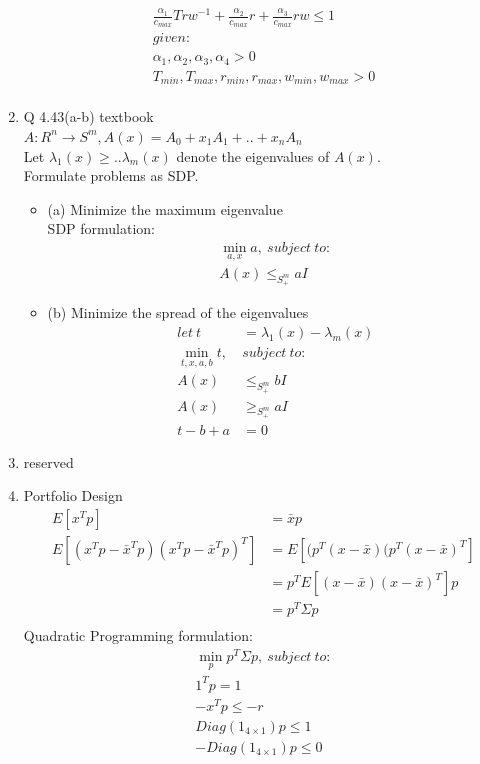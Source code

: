 \documentclass[12pt,letter]{article}
\begin{document}
\begin{enumerate}
\begin{align*}
    \frac{\alpha_1}{c_{max}} T rw^{-1} + \frac{\alpha_2}{c_{max}} r + \frac{\alpha_3}{c_{max}} r w \leq 1\\
    given:\\
    \alpha_1,\alpha_2,\alpha_3,\alpha_4 > 0\\
    T_{min}, T_{max}, r_{min}, r_{max}, w_{min}, w_{max} > 0\\
  \end{align*}
\item Q 4.43(a-b) textbook\\
  $A:R^n \to S^m, A(x) = A_0 + x_1A_1 + .. + x_n A_n$\\
  Let $\lambda_1(x) \geq ..  \lambda_m(x)$ denote the eigenvalues of $A(x)$.\\
  Formulate problems as SDP.\\
  \begin{itemize}
  \item (a) Minimize the maximum eigenvalue\\
    SDP formulation:
    \begin{align*}
      \min_{a,x} a,\ subject\ to:\\
      A(x) \leq_{S_+^m} aI 
    \end{align*}
  \item (b) Minimize the spread of the eigenvalues
    \begin{align*}
      let\ t &= \lambda_1(x) - \lambda_m(x)\\
      \min_{t,x,a,b} t,\ & subject\ to:\\
      A(x) & \leq_{S_+^m} bI \\
      A(x) & \geq_{S_+^m} aI \\
      t - b + a & = 0
    \end{align*}
  \end{itemize}
\item reserved
  
  \pagebreak
  
\item Portfolio Design\\
  \begin{align*}
    E[x^Tp] &=  \bar{x} p\\
    E[(x^Tp-\bar{x}^Tp)(x^Tp-\bar{x}^Tp)^T] &=  E[(p^T(x-\bar{x})(p^T(x-\bar{x})^T]\\
            &=  p^TE[(x-\bar{x})(x-\bar{x})^T]p\\
            &=  p^T\Sigma p\\
  \end{align*}
  Quadratic Programming formulation:\\
  \begin{align*}
    \min_p p^T \Sigma p,\ subject\ to:\\
    1^T p = 1\\
    -x^Tp \leq -r\\
    Diag(1_{4 \times 1}) p \leq 1\\
    -Diag(1_{4 \times 1}) p \leq 0
  \end{align*}
  

\end{enumerate}
\end{document}

